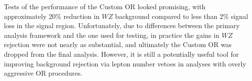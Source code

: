 Tests of the performance of the Custom OR looked promising, with approximately 20\% reduction in $WZ$ background compared to less than 2\% signal loss in the signal region.
Unfortunately, due to differences between the primary analysis framework and the one used for testing, in practice the gains in $WZ$ rejection were not nearly as substantial, and ultimately the Custom OR was dropped from the final analysis.
However, it is still a potentially useful tool for improving background rejection via lepton number vetoes in analyses with overly aggressive OR procedures.
